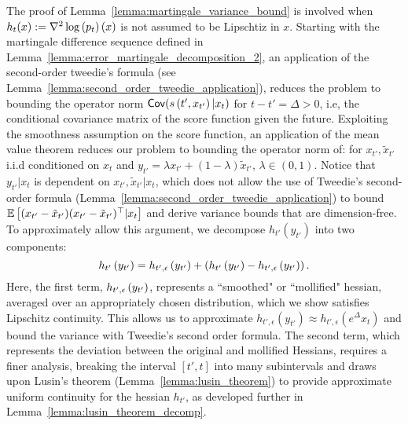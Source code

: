 
The proof of Lemma~\ref{lemma:martingale_variance_bound} is involved when $h_{t}(x) := \nabla^{2}\log\left(p_{t}\right)(x)$ is not assumed to be Lipschtiz in $x$. Starting with the martingale difference sequence defined in Lemma~\ref{lemma:error_martingale_decomposition_2}, an application of the second-order tweedie's formula (see Lemma~\ref{lemma:second_order_tweedie_application}), reduces the problem to bounding the operator norm $\mathsf{Cov}(s\left(t', x_{t'}\right)|x_{t})$ for $t-t' = \Delta > 0$, i.e, the conditional covariance matrix of the score function given the future. 
Exploiting the smoothness assumption on the score function, an application of the mean value theorem reduces our problem to bounding the operator norm of:
for $x_{t'}, \tilde{x}_{t'}$ i.i.d conditioned on $x_{t}$ and $y_{t'} = \lambda x_{t'} + (1-\lambda)\tilde{x}_{t'}$, $\lambda \in (0,1)$. Notice that $y_{t'}|x_t$ is dependent on $x_{t'},\tilde{x}_{t'}|x_t$, which does not allow the use of Tweedie’s second-order formula (Lemma~\ref{lemma:second_order_tweedie_application}) to bound $\mathbb{E}\left[(x_{t'}-\tilde{x}_{t'})(x_{t'}-\tilde{x}_{t'})^{\top}|x_t\right]$ and derive variance bounds that are dimension-free. To approximately allow this argument, we decompose $h_{t'}(y_{t'})$ into two components:
\[
h_{t'}\left(y_{t'}\right) = h_{t', \epsilon}\left(y_{t'}\right) + \left(h_{t'}\left(y_{t'}\right) - h_{t', \epsilon}\left(y_{t'}\right)\right).
\]
Here, the first term, \(h_{t', \epsilon}\left(y_{t'}\right)\), represents a ``smoothed" or ``mollified" hessian, averaged over an appropriately chosen distribution, which we show satisfies Lipschitz continuity. This allows us to approximate $h_{t',\epsilon}(y_{t'}) \approx h_{t',\epsilon}(e^{\Delta}x_t)$ and bound the variance with Tweedie's second order formula. The second term, which represents the deviation between the original and mollified Hessians, requires a finer analysis, breaking the interval $[t', t]$ into many subintervals and draws upon Lusin's theorem (Lemma~\ref{lemma:lusin_theorem}) to provide approximate uniform continuity for the hessian $h_{t'}$, as developed further in Lemma~\ref{lemma:lusin_theorem_decomp}.


